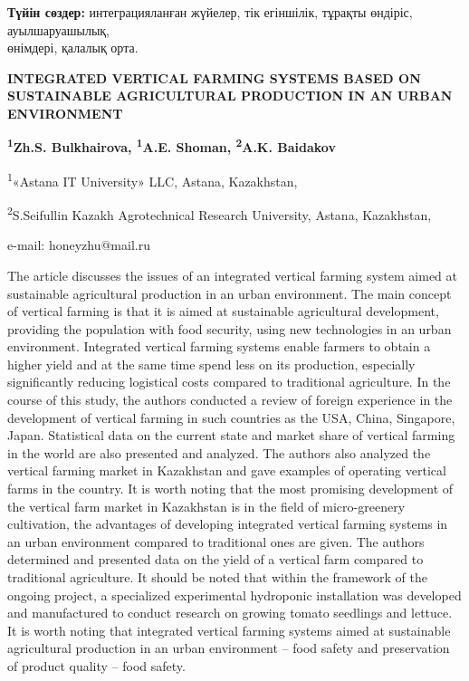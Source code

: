 {\bfseries Түйін сөздер:} интеграцияланған жүйелер, тік егіншілік, тұрақты
өндіріс, ауылшаруашылық, \\өнімдері, қалалық орта.

\begin{articleheader}
{\bfseries INTEGRATED VERTICAL FARMING SYSTEMS BASED ON SUSTAINABLE AGRICULTURAL PRODUCTION IN AN URBAN ENVIRONMENT}

{\bfseries
\textsuperscript{1}Zh.S. Bulkhairova\textsuperscript{\envelope },
\textsuperscript{1}A.E. Shoman,
\textsuperscript{2}A.K. Baidakov
}
\end{articleheader}

\begin{affiliation}
\textsuperscript{1}«Astana IT University» LLC, Astana, Kazakhstan,

\textsuperscript{2}S.Seifullin Kazakh Agrotechnical Research University, Astana, Kazakhstan,

e-mail: honeyzhu@mail.ru
\end{affiliation}

The article discusses the issues of an integrated vertical farming
system aimed at sustainable agricultural production in an urban
environment. The main concept of vertical farming is that it is aimed at
sustainable agricultural development, providing the population with food
security, using new technologies in an urban environment. Integrated
vertical farming systems enable farmers to obtain a higher yield and at
the same time spend less on its production, especially significantly
reducing logistical costs compared to traditional agriculture. In the
course of this study, the authors conducted a review of foreign
experience in the develop\-ment of vertical farming in such countries as
the USA, China, Singapore, Japan. Statistical data on the current state
and market share of vertical farming in the world are also presented and
analyzed. The authors also analyzed the vertical farming market in
Kazakhstan and gave examples of operating vertical farms in the country.
It is worth noting that the most promising development of the vertical
farm market in Kazakhstan is in the field of micro-greenery cultivation,
the advantages of developing integrated vertical farming systems in an
urban environment compared to traditional ones are given. The authors
determined and presented data on the yield of a vertical farm compared
to traditional agriculture. It should be noted that within the framework
of the ongoing project, a specialized experimental hydroponic
installation was developed and manufactured to conduct research on
growing tomato seedlings and lettuce. It is worth noting that integrated
vertical farming systems aimed at sustainable agricultural production in
an urban environment -- food safety and preservation of product quality
-- food safety.

